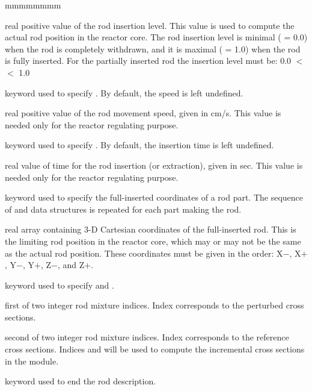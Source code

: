 \begin{ListeDeDescription}{mmmmmmmm}
\item[\dusa{value}] real positive value of the rod insertion level. This
value is used to compute the actual rod position in the reactor core.
The rod insertion level is minimal ( = 0.0) when the rod is
completely withdrawn, and it is maximal ( = 1.0) when the
rod is fully inserted. For the partially inserted rod the insertion level
must be: 0.0 $<$  $<$ 1.0

\item[\moc{SPEED}] keyword used to specify . By default, the speed is left undefined.

\item[\dusa{speed}] real positive value of the rod movement speed,
given in cm/s. This value is needed only for the reactor regulating purpose.

\item[\moc{TIME}] keyword used to specify . By default, the insertion time is left undefined.

\item[\dusa{time}] real value of time for the rod insertion (or extraction),
given in sec. This value is needed only for the reactor regulating purpose.

\item[\moc{MAXPOS}] keyword used to specify the full-inserted
coordinates of a rod part. The sequence of  and  data structures is
repeated for each part making the rod.

\item[\dusa{pos}] real array containing 3-D Cartesian coordinates of the
full-inserted rod. This is the limiting rod position in the reactor core, which
may or may not be the same as the actual rod position. These coordinates
must be given in the order: X$-$, X$+$, Y$-$, Y$+$, Z$-$, and Z$+$.

\item[\moc{DMIX}] keyword used to specify  and .

\item[\dusa{mix1}] first of two integer rod mixture indices. Index  corresponds to the perturbed
cross sections.

\item[\dusa{mix2}] second of two integer rod mixture indices. Index  corresponds to the reference
cross sections. Indices  and  will be used to compute
the incremental cross sections in the  module.

\item[\moc{ENDROD}] keyword used to end the rod description.

\end{ListeDeDescription}

